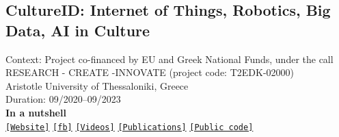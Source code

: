 \subsection{CultureID: Internet of Things, Robotics, Big Data, AI in Culture}

\noindent Context: Project co-financed by EU and Greek National Funds, under the call RESEARCH - CREATE -INNOVATE (project code: T2EDK-02000)\\
\noindent Aristotle University of Thessaloniki, Greece\\
\noindent Duration: 09/2020--09/2023\\

\noindent \textbf{In a nutshell}\\
\noindent \href{https://cultureid.web.auth.gr/?page_id=216&lang=en}{\texttt{[Website]}} \href{https://www.facebook.com/cultureID.Auth}{\texttt{[fb]}} \href{https://www.youtube.com/@cultureidproject}{\texttt{[Videos]}} \href{https://cultureid.web.auth.gr/?page_id=490}{\texttt{[Publications]}} \href{https://github.com/cultureid-auth-ros-packages}{\texttt{[Public code]}}\\


